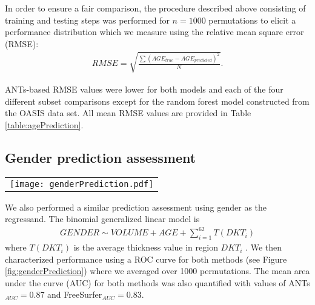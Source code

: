 In order to ensure a fair comparison, the procedure described above consisting
of training and testing steps was performed for $n = 1000$ permutations to elicit a 
performance distribution which we measure using the relative mean square
error (RMSE):
\begin{align}
  RMSE = \sqrt{\frac{\sum \left(AGE_{true} - AGE_{predicted} \right)^2}{N}}.
\end{align}
{}


ANTs-based RMSE values were lower for both models and each of the four
different subset comparisons except for the random forest model constructed
from the OASIS data set. 
All mean RMSE values are provided in Table \ref{table:agePrediction}.



\subsection{Gender prediction assessment}

\begin{figure*}[htb]
  \centering
  \begin{tabular}{c}
  \texttt{[image: genderPrediction.pdf]}
  \end{tabular}
  \caption{Average ROC curve and corresponding AUC distributions
  for gender prediction using ANTs and FreeSurfer thickness values.
  Values were averaged for 1000 permutations resulting in mean
  values of ANTs$_{AUC} =0.87$ and FreeSurfer$_{AUC} =0.83$
  ($p < 10^{-16}$).
  }
  \label{fig:genderPrediction}
\end{figure*}

We also performed a similar prediction assessment using gender
as the regressand.   The binomial generalized linear model is
\begin{align}
  GENDER \sim VOLUME + AGE + \sum_{i=1}^{62} T(DKT_{i})
\end{align}
where $T(DKT_{i})$ is the average thickness value in region $DKT_{i}$
{\color{blue}{and $VOLUME$ is total intracranial volume}}.
We then characterized performance using a ROC curve for both methods 
(see Figure \ref{fig:genderPrediction}) where we averaged over 1000
permutations.  The mean area under the curve (AUC) for
both methods was also quantified with values of ANTs$_{AUC} =0.87$ and 
FreeSurfer$_{AUC} =0.83$.

